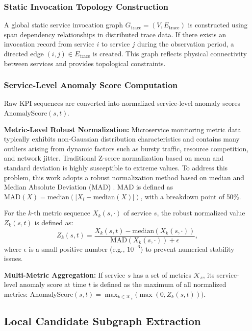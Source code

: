 \documentclass[conference]{IEEEtran}
\begin{document}
\subsubsection{Static Invocation Topology Construction}

A global static service invocation graph $G_{\text{trace}} = (V, E_{\text{trace}})$ is constructed using span dependency relationships in distributed trace data. If there exists an invocation record from service $i$ to service $j$ during the observation period, a directed edge $(i, j) \in E_{\text{trace}}$ is created. This graph reflects physical connectivity between services and provides topological constraints.

\subsubsection{Service-Level Anomaly Score Computation}

Raw KPI sequences are converted into normalized service-level anomaly scores $\text{AnomalyScore}(s,t)$.

\textbf{Metric-Level Robust Normalization:} Microservice monitoring metric data typically exhibits non-Gaussian distribution characteristics and contains many outliers arising from dynamic factors such as bursty traffic, resource competition, and network jitter. Traditional Z-score normalization based on mean and standard deviation is highly susceptible to extreme values. To address this problem, this work adopts a robust normalization method based on median and Median Absolute Deviation (MAD) \cite{leys2013}. MAD is defined as $\text{MAD}(X) = \text{median}(|X_i - \text{median}(X)|)$, with a breakdown point of 50\%.

For the $k$-th metric sequence $X_k(s,\cdot)$ of service $s$, the robust normalized value $Z_k(s,t)$ is defined as:
\begin{equation}
Z_k(s,t) = \frac{X_k(s,t) - \text{median}(X_k(s,\cdot))}{\text{MAD}(X_k(s,\cdot)) + \epsilon},
\end{equation}
where $\epsilon$ is a small positive number (e.g., $10^{-6}$) to prevent numerical stability issues.

\textbf{Multi-Metric Aggregation:} If service $s$ has a set of metrics $\mathcal{K}_s$, its service-level anomaly score at time $t$ is defined as the maximum of all normalized metrics: $\text{AnomalyScore}(s,t) = \max_{k \in \mathcal{K}_s} \big( \max(0, Z_k(s,t)) \big)$.

\subsection{Local Candidate Subgraph Extraction}
\end{document}
